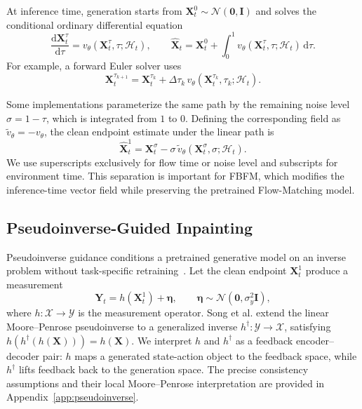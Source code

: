 At inference time, generation starts from
$\mathbf{X}_t^0\sim\mathcal{N}(\mathbf{0},\mathbf{I})$ and solves the conditional
ordinary differential equation
\begin{equation}
    \frac{\mathrm{d}\mathbf{X}_t^\tau}{\mathrm{d}\tau}
    = v_\theta(\mathbf{X}_t^\tau,\tau;\mathcal{H}_t),
    \qquad
    \hat{\mathbf{X}}_t
    = \mathbf{X}_t^0
    + \int_0^1
    v_\theta(\mathbf{X}_t^\tau,\tau;\mathcal{H}_t)\,
    \mathrm{d}\tau.
    \label{eq:flow-matching-ode}
\end{equation}
For example, a forward Euler solver uses
\begin{equation}
    \mathbf{X}_t^{\tau_{k+1}}
    =
    \mathbf{X}_t^{\tau_k}
    + \Delta\tau_k\,
    v_\theta(\mathbf{X}_t^{\tau_k},\tau_k;\mathcal{H}_t).
    \label{eq:flow-matching-euler}
\end{equation}

Some implementations parameterize the same path by the remaining noise level
$\sigma=1-\tau$, which is integrated from $1$ to $0$. Defining the
corresponding field as
$\tilde v_\theta=-v_\theta$, the clean endpoint estimate under the linear path is
\begin{equation}
    \hat{\mathbf{X}}_t^1
    =
    \mathbf{X}_t^\sigma
    -\sigma\,
    \tilde v_\theta(\mathbf{X}_t^\sigma,\sigma;\mathcal{H}_t).
    \label{eq:clean-endpoint-estimate}
\end{equation}
We use superscripts exclusively for flow time or noise level and subscripts for
environment time. This separation is important for FBFM, which modifies the
inference-time vector field while preserving the pretrained Flow-Matching model.

\subsection{Pseudoinverse-Guided Inpainting}
\label{sec:preliminaries:pseudoinverse-inpainting}

Pseudoinverse guidance conditions a pretrained generative model on an inverse
problem without task-specific retraining~\cite{song2023pseudoinverse}. Let the clean
endpoint $\mathbf{X}_t^1$ produce a measurement
\begin{equation}
    \mathbf{Y}_t=h(\mathbf{X}_t^1)+\boldsymbol{\eta},
    \qquad
    \boldsymbol{\eta}\sim\mathcal{N}(\mathbf{0},\sigma_y^2\mathbf{I}),
    \label{eq:inverse-problem}
\end{equation}
where $h:\mathcal{X}\rightarrow\mathcal{Y}$ is the measurement operator. Song
et al. extend the linear Moore--Penrose pseudoinverse to a generalized inverse
$h^\dagger:\mathcal{Y}\rightarrow\mathcal{X}$, satisfying
$h(h^\dagger(h(\mathbf{X})))=h(\mathbf{X})$. We interpret $h$ and
$h^\dagger$ as a feedback encoder--decoder pair: $h$ maps a generated
state-action object to the feedback space, while $h^\dagger$ lifts feedback back
to the generation space. The precise consistency assumptions and their local
Moore--Penrose interpretation are provided in Appendix~\ref{app:pseudoinverse}.

